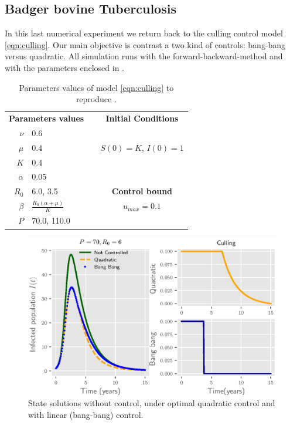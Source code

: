 \subsection*{Badger bovine Tuberculosis}
In this last numerical experiment we return back to the culling control model
\eqref{eqn:culling}. Our main objective is contrast a two kind of controls: 
bang-bang versus quadratic. All simulation runs with the 
forward-backward-method and with the parameters enclosed in 
.


\begin{table}[H]
  \begin{center}
    \begin{tabular}{@{}rllc@{}}
      \toprule
      \multicolumn{2}{c}{\textbf{Parameters values}}
      &&
      \textbf{Initial Conditions}
      \\
      \cmidrule{1-2}
      \cmidrule{4-4}
      $\nu$
        & \num{0.6}
      \\
      $\mu$
        & \num{0.4}
        &&  
          $S(0) = K$, 
          $I(0) = 1$
      \\
      $K$
        & \num{0.4}
      \\
      $\alpha$
        & \num{0.05}
      \\
      $R_0$
        & \num{6.0}, \num{3.5}
        && 
          \textbf{Control bound}
      \\
      \cmidrule{4-4}
      $\beta$
        &
         $
          \displaystyle
          \frac{R_0(\alpha + \mu)}{K}
         $
        &&
          $u_{max} = \num{0.1}$
      \\
      $P$
        & \num{70.0}, \num{110.0}
      \\
      \bottomrule
    \end{tabular}
  \end{center}
  \caption{Parameters values of model \eqref{eqn:culling} to reproduce 
  .}
  \label{tbl:culling_par}
\end{table}

\begin{figure}[H]
  \centering
  \includegraphics{Figures/figure_1_culling}
  \caption{State solutions without control, under optimal quadratic control 
  and with linear (bang-bang) control.}
  \label{fig:figure1culling}
\end{figure}

